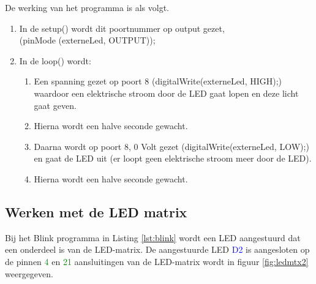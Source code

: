 De werking van het programma is als volgt.
\begin{enumerate}
	\item In de \textcolor{arduinoGreen}{setup}() wordt dit poortnummer op output gezet,\\  (\textcolor{arduinoOrange}	{pinMode} (externeLed,  \textcolor{arduinoBlue}{OUTPUT})); 
\item In de \textcolor{arduinoGreen}{loop}() wordt:
\begin{enumerate}
	\item Een spanning gezet op poort 8 (\textcolor{arduinoOrange}{digitalWrite}(externeLed, \textcolor{arduinoBlue}{HIGH});) waardoor een elektrische stroom door de LED gaat lopen en deze licht gaat geven. 
	\item Hierna wordt een halve seconde gewacht.
	\item Daarna wordt op poort 8,  0 Volt gezet (\textcolor{arduinoOrange}{digitalWrite}(externeLed, \textcolor{arduinoBlue}{LOW});) en gaat de LED uit (er loopt geen elektrische stroom meer door de LED).
		\item Hierna wordt een halve seconde gewacht.
\end{enumerate} 
\end{enumerate}
 
\subsection{Werken met de LED matrix}

Bij het Blink programma in Listing \ref{lst:blink} wordt een LED aangestuurd dat een onderdeel is van de LED-matrix. De aangestuurde LED \textcolor{blue}{D2} is aangesloten op de pinnen \textcolor{green}{4} en \textcolor{green}{21}  aansluitingen van de LED-matrix wordt in figuur \ref{fig:ledmtx2} weergegeven.


